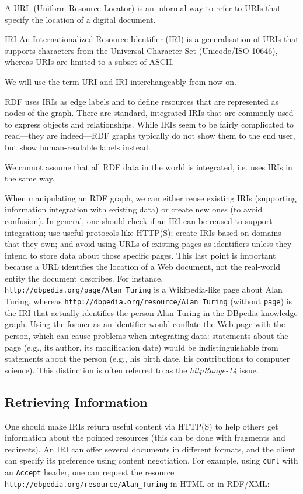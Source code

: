 A URL (Uniform Resource Locator) is an informal way to refer to URIs that specify the location of a digital document.

\begin{definition}{IRI}
    An Internationalized Resource Identifier (IRI) is a generalisation of URIs that supports characters from the Universal Character Set (Unicode/ISO 10646), whereas URIs are limited to a subset of ASCII.
\end{definition}

We will use the term URI and IRI interchangeably from now on.

RDF uses IRIs as edge labels and to define resources that are represented as nodes of the graph. There are standard, integrated IRIs that are commonly used to express objects and relationships. While IRIs seem to be fairly complicated to read—they are indeed—RDF graphs typically do not show them to the end user, but show human-readable labels instead.

\begin{note}{}
    We cannot assume that all RDF data in the world is integrated, i.e. uses IRIs in the same way.
\end{note}

When manipulating an RDF graph, we can either reuse existing IRIs (supporting information integration with existing data) or create new ones (to avoid confusion). In general, one should check if an IRI can be reused to support integration; use useful protocols like HTTP(S); create IRIs based on domains that they own; and avoid using URLs of existing pages as identifiers unless they intend to store data about those specific pages. This last point is important because a URL identifies the location of a Web document, not the real-world entity the document describes. For instance, \texttt{http://dbpedia.org/page/Alan\_Turing} is a Wikipedia-like page about Alan Turing, whereas \texttt{http://dbpedia.org/resource/Alan\_Turing} (without \texttt{page}) is the IRI that actually identifies the person Alan Turing in the DBpedia knowledge graph. Using the former as an identifier would conflate the Web page with the person, which can cause problems when integrating data: statements about the page (e.g., its author, its modification date) would be indistinguishable from statements about the person (e.g., his birth date, his contributions to computer science). This distinction is often referred to as the \emph{httpRange-14} issue.

\subsection{Retrieving Information}
One should make IRIs return useful content via HTTP(S) to help others get information about the pointed resources (this can be done with fragments and redirects). An IRI can offer several documents in different formats, and the client can specify its preference using content negotiation. For example, using \texttt{curl} with an \texttt{Accept} header, one can request the resource \texttt{http://dbpedia.org/resource/Alan\_Turing} in HTML or in RDF/XML:

